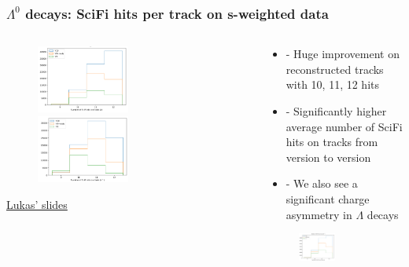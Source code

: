 \documentclass[aspectratio=1610, 12pt, xcolor=dvipsnames]{beamer}
\begin{document}
\begin{frame}\frametitle{$\Lambda^0$ decays: SciFi hits per track on s-weighted data}
  \begin{columns}
    \begin{column}[c]{0.48\textwidth}
      \begin{figure}
        \includegraphics[width=0.5\textwidth]{plots/pos_lambda.png}
        \includegraphics[width=0.5\textwidth]{plots/neg_lambda.png}
      \end{figure}
      \href{https://indico.cern.ch/event/1275407/contributions/5419773/attachments/2653633/4595138/LC_WP4_5_250523.pdf}{Lukas' slides} %
    \end{column}
    \begin{column}[c]{0.48\textwidth}
      \begin{itemize}
        \item - Huge improvement on reconstructed tracks with 10, 11, 12 hits
        \item - Significantly higher average number of SciFi hits on tracks from version to version
        \item - We also see a significant charge asymmetry in $\Lambda$ decays
      \end{itemize}
      \begin{figure}
        \includegraphics[width=0.5\textwidth]{plots/sw_lambda.png}
      \end{figure}
    \end{column}
  \end{columns}
\end{frame}
\end{document}
